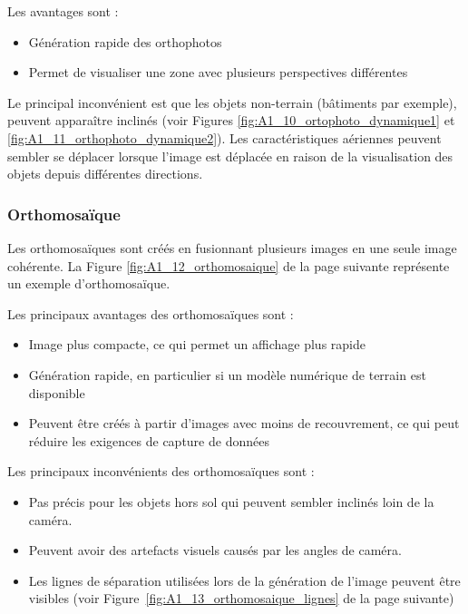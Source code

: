 \newpage
Les avantages sont :
\begin{itemize}
    \item Génération rapide des orthophotos
    \item Permet de visualiser une zone avec plusieurs perspectives différentes
\end{itemize}

Le principal inconvénient est que les objets non-terrain (bâtiments par exemple), peuvent apparaître inclinés (voir Figures \ref{fig:A1_10_ortophoto_dynamique1} et \ref{fig:A1_11_orthophoto_dynamique2}). Les caractéristiques aériennes peuvent sembler se déplacer lorsque l'image est déplacée en raison de la visualisation des objets depuis différentes directions.

\subsubsection{Orthomosaïque}

Les orthomosaïques sont créés en fusionnant plusieurs images en une seule image cohérente. La Figure \ref{fig:A1_12_orthomosaique}  de la page suivante représente un exemple d'orthomosaïque.

Les principaux avantages des orthomosaïques sont :
\begin{itemize}
    \item Image plus compacte, ce qui permet un affichage plus rapide
    \item Génération rapide, en particulier si un modèle numérique de terrain est disponible
    \item Peuvent être créés à partir d'images avec moins de recouvrement, ce qui peut réduire les exigences de capture de données
\end{itemize}

Les principaux inconvénients des orthomosaïques sont :
\begin{itemize}
    \item Pas précis pour les objets hors sol qui peuvent sembler inclinés loin de la caméra.
    \item Peuvent avoir des artefacts visuels causés par les angles de caméra.
    \item Les lignes de séparation utilisées lors de la génération de l'image peuvent être visibles (voir Figure~\ref{fig:A1_13_orthomosaique_lignes} de la page suivante)
\end{itemize}

